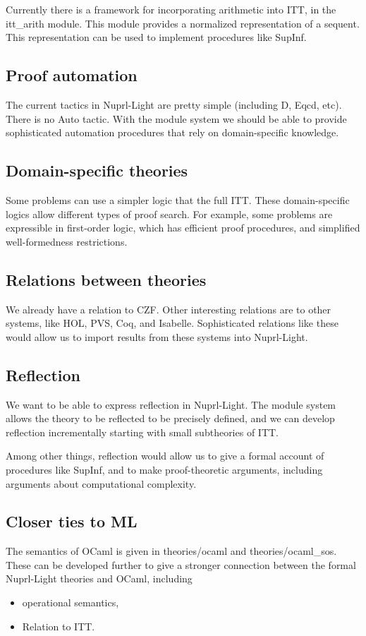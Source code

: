 \documentclass{article}
\begin{document}
Currently there is a framework for incorporating arithmetic into ITT,
in the itt\_arith module.  This module provides a normalized
representation of a sequent.  This representation can be used to
implement procedures like SupInf.

\subsection{Proof automation}
The current tactics in Nuprl-Light are pretty simple (including D,
Eqcd, etc).  There is no Auto tactic.  With the module system we should
be able to provide sophisticated automation procedures that rely on
domain-specific knowledge.

\subsection{Domain-specific theories}
Some problems can use a simpler logic that the full ITT.  These
domain-specific logics allow different types of proof search.  For
example, some problems are expressible in first-order logic, which has
efficient proof procedures, and simplified well-formedness
restrictions.

\subsection{Relations between theories}
We already have a relation to CZF.  Other interesting relations are to
other systems, like HOL, PVS, Coq, and Isabelle.  Sophisticated
relations like these would allow us to import results from these
systems into Nuprl-Light.

\subsection{Reflection}
We want to be able to express reflection in Nuprl-Light.  The module
system allows the theory to be reflected to be precisely defined, and
we can develop reflection incrementally starting with small
subtheories of ITT.

Among other things, reflection would allow us to give a formal account
of procedures like SupInf, and to make proof-theoretic arguments,
including arguments about computational complexity.

\subsection{Closer ties to ML}
The semantics of OCaml is given in theories/ocaml and
theories/ocaml\_sos.  These can be developed further to give a stronger
connection between the formal Nuprl-Light theories and OCaml,
including
\begin{itemize}
\item
operational semantics,
\item
Relation to ITT.
\end{itemize}
\end{document}
